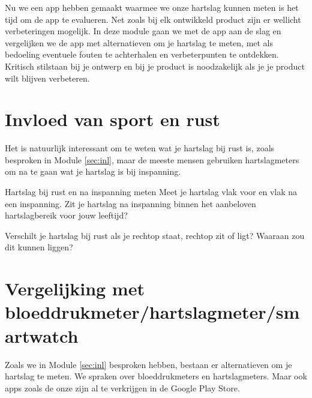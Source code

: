 
\begin{samenvatting}
	Nu we een app hebben gemaakt waarmee we onze hartslag kunnen meten is het tijd om de app te evalueren. Net zoals bij elk ontwikkeld product zijn er wellicht verbeteringen mogelijk. In deze module gaan we met de app aan de slag en vergelijken we de app met alternatieven om je hartslag te meten, met als bedoeling eventuele fouten te achterhalen en verbeterpunten te ontdekken. Kritisch stilstaan bij je ontwerp en bij je product is noodzakelijk als je je product wilt blijven verbeteren.
\end{samenvatting}
%

\section{Invloed van sport en rust}
\label{sec:Mod6_Sec2}
%

Het is natuurlijk interessant om te weten wat je hartslag bij rust is, zoals besproken in Module \ref{sec:inl}, maar de meeste mensen gebruiken hartslagmeters om na te gaan wat je hartslag is bij inspanning.

\begin{opdracht}{Hartslag bij rust en na inspanning meten}
Meet je hartslag vlak voor en vlak na een inspanning. Zit je hartslag na inspanning binnen het aanbeloven hartslagbereik voor jouw leeftijd?

Verschilt je hartslag bij rust als je rechtop staat, rechtop zit of ligt? Waaraan zou dit kunnen liggen?
\end{opdracht}

\section{Vergelijking met bloeddrukmeter/hartslagmeter/smartwatch}
\label{sec:Mod6_Sec1}
%
Zoals we in Module \ref{sec:inl} besproken hebben, bestaan er alternatieven om je hartslag te meten. We spraken over bloeddrukmeters en hartslagmeters. Maar ook apps zoals de onze zijn al te verkrijgen in de Google Play Store.

